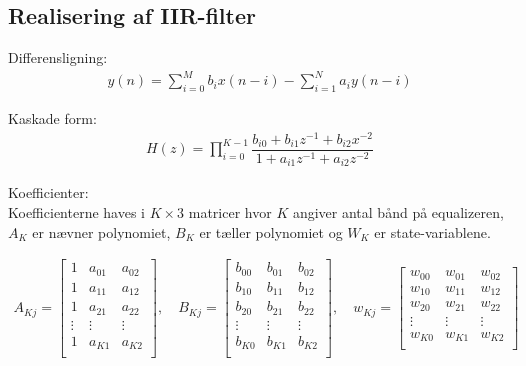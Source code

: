  
  
 



 
    \subsection{Realisering af IIR-filter}

    Differensligning:
    \begin{align}
    y(n) = \sum\limits_{i=0}^{M} b_i x(n-i) - \sum\limits_{i=1}^N a_i y(n-i)
    \end{align}


   

Kaskade form:\\

    
   \begin{align}
   H(z) = \prod\limits_{i=0}^{K-1} \dfrac{b_{i0} + b_{i1} z^{-1} + b_{i2} x^{-2}}{1 + a_{i1} z^{-1} + a_{i2} z^{-2}} 
   \end{align}


   Koefficienter:\\
   Koefficienterne haves i $K \times 3$ matricer hvor $K$ angiver antal bånd på equalizeren,
    $A_K$ er nævner polynomiet, $B_K$ er tæller polynomiet
   og $W_K$ er state-variablene.  


   \begin{align}
   A_{Kj} = \left[\begin{matrix}
   1 			& a_{01} 	& a_{02} \\
   1 			& a_{11} 	& a_{12} \\
   1 			& a_{21} 	& a_{22} \\
   \vdots 		& \vdots 	&  \vdots \\
   1 			& a_{K1} 	& a_{K2} \\
   \end{matrix}
   \right], \quad
      B_{Kj} = \left[\begin{matrix}
   b_{00}		& b_{01} 	& b_{02} \\
   b_{10}		& b_{11} 	& b_{12} \\
   b_{20}		& b_{21} 	& b_{22} \\
   \vdots 		& \vdots 	&  \vdots \\
   b_{K0}		& b_{K1} 	& b_{K2} \\
   \end{matrix}
   \right], \quad
      w_{Kj} = \left[\begin{matrix}
   w_{00}		& w_{01} 	& w_{02} \\
   w_{10}		& w_{11} 	& w_{12} \\
   w_{20}		& w_{21} 	& w_{22} \\
   \vdots 		& \vdots 	&  \vdots \\
   w_{K0}		& w_{K1} 	& w_{K2} \\
   \end{matrix}
   \right]
   \end{align}


